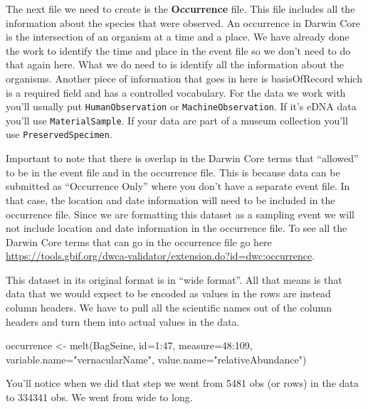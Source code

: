 \documentclass[
]{book}
\newenvironment{Shaded}{\begin{snugshade}}{\end{snugshade}}
\newcommand{\AttributeTok}[1]{\textcolor[rgb]{0.77,0.63,0.00}{#1}}
\newcommand{\DecValTok}[1]{\textcolor[rgb]{0.00,0.00,0.81}{#1}}
\newcommand{\FunctionTok}[1]{\textcolor[rgb]{0.00,0.00,0.00}{#1}}
\newcommand{\NormalTok}[1]{#1}
\newcommand{\OtherTok}[1]{\textcolor[rgb]{0.56,0.35,0.01}{#1}}
\newcommand{\SpecialCharTok}[1]{\textcolor[rgb]{0.00,0.00,0.00}{#1}}
\newcommand{\StringTok}[1]{\textcolor[rgb]{0.31,0.60,0.02}{#1}}
\begin{document}
The next file we need to create is the \textbf{Occurrence} file. This file includes all the information about the species that were observed. An occurrence in Darwin Core is the intersection of an organism at a time and a place. We have already done the work to identify the time and place in the event file so we don't need to do that again here. What we do need to is identify all the information about the organisms. Another piece of information that goes in here is basisOfRecord which is a required field and has a controlled vocabulary. For the data we work with you'll usually put \texttt{HumanObservation} or \texttt{MachineObservation}. If it's eDNA data you'll use \texttt{MaterialSample}. If your data are part of a museum collection you'll use \texttt{PreservedSpecimen}.

Important to note that there is overlap in the Darwin Core terms that ``allowed'' to be in the event file and in the occurrence file. This is because data can be submitted as ``Occurrence Only'' where you don't have a separate event file. In that case, the location and date information will need to be included in the occurrence file. Since we are formatting this dataset as a sampling event we will not include location and date information in the occurrence file. To see all the Darwin Core terms that can go in the occurrence file go here \url{https://tools.gbif.org/dwca-validator/extension.do?id=dwc:occurrence}.

This dataset in its original format is in ``wide format''. All that means is that data that we would expect to be encoded as values in the rows are instead column headers. We have to pull all the scientific names out of the column headers and turn them into actual values in the data.

\begin{Shaded}
\begin{Highlighting}[]
\NormalTok{occurrence }\OtherTok{\textless{}{-}} \FunctionTok{melt}\NormalTok{(BagSeine, }\AttributeTok{id=}\DecValTok{1}\SpecialCharTok{:}\DecValTok{47}\NormalTok{, }\AttributeTok{measure=}\DecValTok{48}\SpecialCharTok{:}\DecValTok{109}\NormalTok{, }\AttributeTok{variable.name=}\StringTok{"vernacularName"}\NormalTok{, }\AttributeTok{value.name=}\StringTok{"relativeAbundance"}\NormalTok{)}
\end{Highlighting}
\end{Shaded}

You'll notice when we did that step we went from 5481 obs (or rows) in the data to 334341 obs. We went from wide to long.
\end{document}
